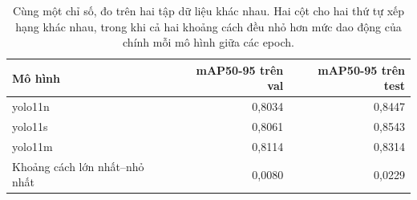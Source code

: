 \begin{table}[H]
\centering
\caption{Cùng một chỉ số, đo trên hai tập dữ liệu khác nhau. Hai cột cho hai thứ tự xếp hạng khác nhau, trong khi cả hai khoảng cách đều nhỏ hơn mức dao động của chính mỗi mô hình giữa các epoch.}
\label{tab:ordering}
\small
\begin{tabular}{l r r}
\toprule
Mô hình & mAP50-95 trên val & mAP50-95 trên test \\
\midrule
yolo11n & 0{,}8034 & 0{,}8447 \\
yolo11s & 0{,}8061 & 0{,}8543 \\
yolo11m & 0{,}8114 & 0{,}8314 \\
\midrule
Khoảng cách lớn nhất--nhỏ nhất & 0{,}0080 & 0{,}0229 \\
\bottomrule
\end{tabular}
\end{table}
